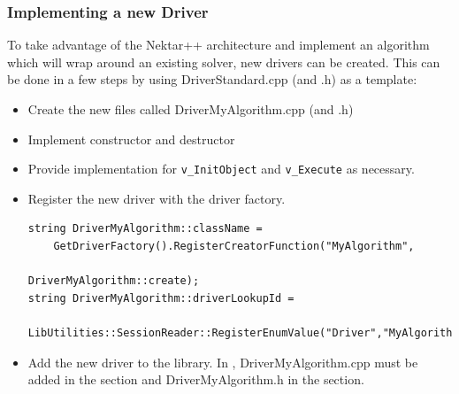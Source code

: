 \subsubsection{Implementing a new Driver}
To take advantage of the Nektar++ architecture and implement an algorithm 
which will wrap around an existing solver, new drivers can be created. This can
be done in a few steps by using DriverStandard.cpp (and .h) as a template:
\begin{itemize}
\item Create the new files called DriverMyAlgorithm.cpp (and .h)
\item Implement constructor and destructor
\item Provide implementation for \texttt{v\_InitObject} and \texttt{v\_Execute}
as necessary.
\item Register the new driver with the driver factory.
\begin{lstlisting}[style=C++Style]
string DriverMyAlgorithm::className = 
    GetDriverFactory().RegisterCreatorFunction("MyAlgorithm",
                                               DriverMyAlgorithm::create); 
string DriverMyAlgorithm::driverLookupId = 
    LibUtilities::SessionReader::RegisterEnumValue("Driver","MyAlgorithm",0);
\end{lstlisting}
\item Add the new driver to the library. In , 
DriverMyAlgorithm.cpp must be added in the  
section and DriverMyAlgorithm.h in the  section.
\end{itemize}